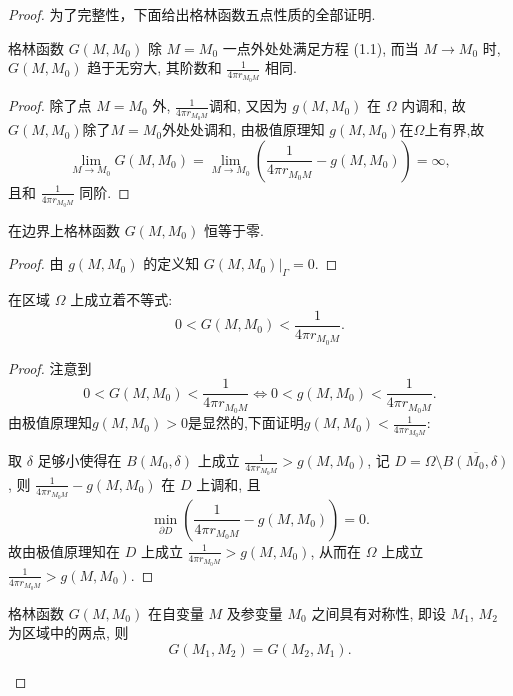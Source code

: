 \begin{proof}
  为了完整性，下面给出格林函数五点性质的全部证明.

  \begin{property}
    格林函数 $G(M, M_0)$ 除 $M=M_0$ 一点外处处满足方程 (1.1), 而当 $M\to M_0$ 时,
    $G(M, M_0)$ 趋于无穷大, 其阶数和 $\frac{1}{4\pi r_{M_0M}}$ 相同.
  \end{property}

  \begin{proof}
    除了点 $M=M_0$ 外, $\frac{1}{4\pi r_{M_0M}}$调和,
    又因为 $g(M,M_0)$ 在 $\varOmega$ 内调和, 故$G(M,M_0)$除了$M=M_0$外处处调和,
    由极值原理知 $g(M,M_0)$在$\varOmega$上有界,故
    \[\lim_{M\to M_0}G(M,M_0)=\lim_{M\to M_0}\left(\frac{1}{4\pi r_{M_0M}}-g(M,M_0)\right)=\infty,\]
    且和 $\frac{1}{4\pi r_{M_0M}}$ 同阶.
  \end{proof}

  \begin{property}
    在边界上格林函数 $G(M, M_0)$ 恒等于零.
  \end{property}

  \begin{proof}
    由 $g(M,M_0)$ 的定义知 $G(M,M_0)|_{\varGamma}=0$.
  \end{proof}

  \begin{property}
    在区域 $\varOmega$ 上成立着不等式:
    \[0 < G(M, M_0) < \frac{1}{4\pi r_{M_0M}}.\]
  \end{property}
  
  \begin{proof}
    注意到
    \[0<G(M,M_0)<\frac{1}{4\pi r_{M_0M}}\Leftrightarrow 0<g(M,M_0)<\frac{1}{4\pi r_{M_0M}}.\]
    由极值原理知$g(M,M_0)>0$是显然的,下面证明$g(M,M_0)<\frac{1}{4\pi r_{M_0M}}$:

    取 $\delta$ 足够小使得在 $B(M_0,\delta)$ 上成立 $\frac{1}{4\pi r_{M_0M}}>g(M,M_0)$,
    记 $D=\varOmega\setminus\overline{B(M_0,\delta)}$,
    则 $\frac{1}{4\pi r_{M_0M}}-g(M,M_0)$ 在 $D$ 上调和, 且
    \[\min_{\partial D}\left(\frac{1}{4\pi r_{M_0M}}-g(M,M_0)\right)=0.\]
    故由极值原理知在 $D$ 上成立 $\frac{1}{4\pi r_{M_0M}}>g(M,M_0)$,
    从而在 $\varOmega$ 上成立 $\frac{1}{4\pi r_{M_0M}}>g(M,M_0)$.
  \end{proof}

  \begin{property}
    格林函数 $G(M, M_0)$ 在自变量 $M$ 及参变量 $M_0$ 之间具有对称性, 即设
    $M_1$, $M_2$ 为区域中的两点, 则
    \[G(M_1, M_2) = G(M_2, M_1).\]
  \end{property}
  

\end{proof}
